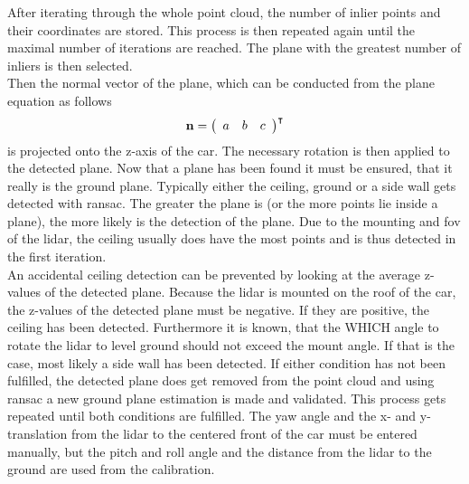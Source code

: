 After iterating through the whole point cloud, the number of inlier points and their coordinates are stored.
This process is then repeated again until the maximal number of iterations are reached.
The plane with the greatest number of inliers is then selected.\\
Then the normal vector of the plane, which can be conducted from the plane equation as follows
\begin{equation}
    \vb{n} = \left(\begin{array}{lll} a & b & c \end{array}\right)^{\intercal}
\end{equation}
is projected onto the z-axis of the car.
The necessary rotation is then applied to the detected plane.
Now that a plane has been found it must be ensured, that it really is the ground plane.
Typically either the ceiling, ground or a side wall gets detected with \gls{ransac}.
The greater the plane is (or the more points lie inside a plane), the more likely is the detection of the plane.
Due to the mounting and \gls{fov} of the \gls{lidar}, the ceiling usually does have the most points and is thus detected in the first iteration.\\
An accidental ceiling detection can be prevented by looking at the average z-values of the detected plane.
Because the lidar is mounted on the roof of the car, the z-values of the detected plane must be negative.
If they are positive, the ceiling has been detected.
Furthermore it is known, that the WHICH angle to rotate the lidar to level ground should not exceed the mount angle.
If that is the case, most likely a side wall has been detected.
If either condition has not been fulfilled, the detected plane does get removed from the point cloud and using \gls{ransac} a new ground plane estimation is made and validated.
This process gets repeated until both conditions are fulfilled.
The yaw angle and the x- and y-translation from the \gls{lidar} to the centered front of the car
must be entered manually, but the pitch and roll angle and the distance from the \gls{lidar} to the ground are used from the calibration.



